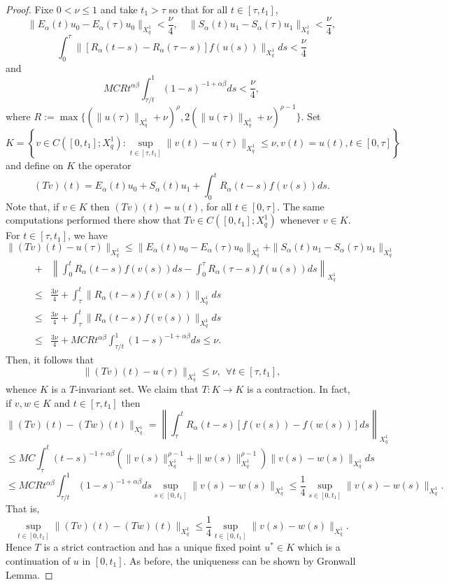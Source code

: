 \documentclass[12pt,reqno]{amsart}
\begin{document}
\begin{proof}
	Fixe $0<\nu\leq 1$  and take $t_1> \tau $ so that for all $t\in [\tau, t_1]$,
	$$\|E_{\alpha}(t)u_0-E_{\alpha}(\tau)u_0\|_{X^{1}_{q}}<\dfrac{\nu}{4},\quad \|S_{\alpha}(t)u_1-S_{\alpha}(\tau )u_1\|_{X^{1}_{q}}< \dfrac{\nu}{4},$$
	$$\int_{0}^{\tau }\|[R_{\alpha}(t-s)-R_{\alpha}(\tau -s)]f(u(s))\|_{X^{1}_{q}}ds< \dfrac{\nu}{4}$$
	and
	$$MCRt^{\alpha\beta}\int_{\tau /t}^{1}(1-s)^{-1+\alpha\beta}ds< \dfrac{\nu}{4}, $$
	where $R:=\max\{(\|u(\tau )\|_{X^{1}_{q}}+\nu)^{\rho}, 2(\|u(\tau )\|_{X^{1}_{q}}+\nu)^{\rho-1}\}$.  Set
	$$K=\left\{v\in C([0,t_1]; X^{1}_{q}): \sup_{t\in[\tau ,t_1]}\|v(t)-u(\tau )\|_{X^{1}_{q}}\leq\nu, v(t)=u(t), t\in[0,\tau ]\right\}$$
	and define on $K$ the operator 
	$$(Tv)(t)=E_{\alpha}(t)u_0+S_{\alpha}(t)u_1+\int_{0}^{t}R_{\alpha}(t-s)f(v(s))ds.$$
	Note that, if $v\in K$ then $(Tv)(t)=u(t)$, for all $t\in[0,\tau ]$. The same computations performed there show that $Tv\in C([0,t_1]; X^{1}_{q})$  whenever $v\in K$. For $t\in[\tau ,t_1]$, we have
	$$\|(Tv)(t)-u(\tau )\|_{X^{1}_{q}}\leq\|E_{\alpha}(t)u_0-E_{\alpha}(\tau)u_0\|_{X^{1}_{q}} + \|S_{\alpha}(t)u_1-S_{\alpha}(\tau)u_1\|_{X^{1}_{q}}$$
	\begin{eqnarray*}	
		&+& \left\|\int_{0}^{t}R_{\alpha}(t-s)f(v(s))ds-\int_{0}^{\tau }R_{\alpha}(\tau -s)f(u(s))ds \right\|_{X^{1}_{q}}\\
		&\leq& \frac{3\nu}{4} +  \int_{\tau }^{t}\|R_{\alpha}(t-s)f(v(s))\|_{X^{1}_{q}}ds\\
		&\leq& \frac{3\nu}{4} + \int_{\tau }^{t}\|R_{\alpha}(t-s)f(v(s))\|_{X^{1}_{q}}ds\\
		&\leq& \frac{3\nu}{4}+MCRt^{\alpha\beta}\int_{\tau /t}^{1}(1-s)^{-1+\alpha\beta}ds\le \nu.
	\end{eqnarray*} 
	Then, it follows that
	$$\|(Tv)(t)-u(\tau )\|_{X^{1}_{q}}\leq \nu, \ \ \forall t\in [\tau ,t_1],$$
	whence $K$ is a $T$-invariant set. We claim that $T:K\rightarrow K$ is a contraction. In fact, if $v,w\in K$ and $t\in[\tau , t_1]$ then
	$$\|(Tv)(t)-(Tw)(t)\|_{X^{1}_{q}}=\left\|\int_{\tau }^{t}R_{\alpha}(t-s)[f(v(s))-f(w(s))]ds\right\|_{X^{1}_{q}}$$
	$$\leq MC\int_{\tau }^{t}(t-s)^{-1+\alpha\beta}(\|v(s)\|_{X^{1}_{q}}^{\rho-1}+\|w(s)\|_{X^{1}_{q}}^{\rho-1})\|v(s)-w(s)\|_{X^{1}_{q}}ds$$
	$$\leq MCRt^{\alpha\beta}\int_{\tau /t}^{1}(1-s)^{-1+\alpha\beta}ds\sup_{s\in[0,t_1]}\|v(s)-w(s)\|_{X^{1}_{q}}\leq \frac{1}{4}\sup_{s\in[0,t_1]}\|v(s)-w(s)\|_{X^{1}_{q}}.$$
	That is,
	$$\sup_{t\in[0,t_1]}\|(Tv)(t)-(Tw)(t)\|_{X^{1}_{q}}\leq\frac{1}{4}\sup_{t\in[0,t_1]}\|v(s)-w(s)\|_{X^{1}_{q}}.$$
	Hence $T$ is a strict contraction and has a unique fixed point $u^\ast\in K$ which is a continuation of $u$ in $[0,t_1]$. As before, the uniqueness can be shown by Gronwall Lemma.
\end{proof}
\end{document}
